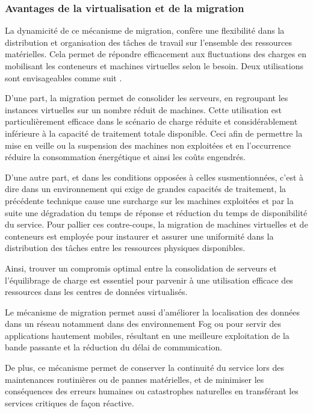 \subsubsection{Avantages de la virtualisation et de la migration}
La dynamicité de ce mécanisme de migration, confère une flexibilité dans la distribution et organisation des tâches de travail sur l'ensemble des ressources matérielles. Cela permet de répondre efficacement aux fluctuations des charges en mobilisant les conteneurs et machines virtuelles selon le besoin. Deux utilisations sont envisageables comme suit \cite{boutaba2013}.\par
D'une part, la migration permet de consolider les serveurs, en regroupant les instances virtuelles sur un nombre réduit de machines. Cette utilisation est particulièrement efficace dans le scénario de charge réduite et considérablement inférieure à la capacité de traitement totale disponible. Ceci afin de permettre la mise en veille ou la suspension des machines non exploitées et en l'occurrence réduire la consommation énergétique et ainsi les coûts engendrés.\par
D'une autre part, et dans les conditions opposées à celles susmentionnées, c'est à dire dans un environnement qui exige de grandes capacités de traitement, la précédente technique cause une surcharge sur les machines exploitées et par la suite une dégradation du temps de réponse et réduction du temps de disponibilité du service. Pour pallier ces contre-coups, la migration de machines virtuelles et de conteneurs est employée pour instaurer et assurer une uniformité dans la distribution des tâches entre les ressources physiques disponibles.\par
Ainsi, trouver un compromis optimal entre la consolidation de serveurs et l'équilibrage de charge est essentiel pour parvenir à une utilisation efficace des ressources dans les centres de données virtualisés.\par
Le mécanisme de migration permet aussi d'améliorer la localisation des données dans un réseau notamment dans des environnement Fog ou pour servir des applications hautement mobiles, résultant en une meilleure exploitation de la bande passante et la réduction du délai de communication.\par
De plus, ce mécanisme permet de conserver la continuité du service lors des maintenances routinières ou de pannes matérielles, et de minimiser les conséquences des erreurs humaines ou catastrophes naturelles en transférant les services critiques de façon réactive.
